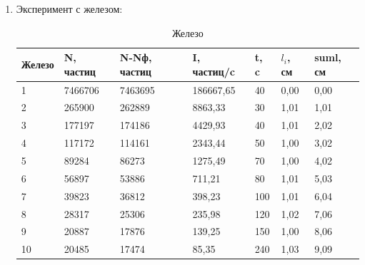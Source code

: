 \documentclass[a4paper]{article}
\begin{document}
\begin{enumerate}
    \item Эксперимент с железом:
        \begin{table}[H]
            \begin{center}
                \begin{tabular}{|l|l|l|l|l|l|l|}
                    \hline
                    Железо & N, частиц & N-Nф, частиц & I, частиц/c & t, c &  $l_i$, см & suml, см \\ \hline
                    1      & 7466706   & 7463695      & 186667,65   & 40   & 0,00     & 0,00     \\ \hline
                    2      & 265900    & 262889       & 8863,33     & 30   & 1,01     & 1,01     \\ \hline
                    3      & 177197    & 174186       & 4429,93     & 40   & 1,01     & 2,02     \\ \hline
                    4      & 117172    & 114161       & 2343,44     & 50   & 1,00     & 3,02     \\ \hline
                    5      & 89284     & 86273        & 1275,49     & 70   & 1,00     & 4,02     \\ \hline
                    6      & 56897     & 53886        & 711,21      & 80   & 1,01     & 5,03     \\ \hline
                    7      & 39823     & 36812        & 398,23      & 100  & 1,01     & 6,04     \\ \hline
                    8      & 28317     & 25306        & 235,98      & 120  & 1,02     & 7,06     \\ \hline
                    9      & 20887     & 17876        & 139,25      & 150  & 1,00     & 8,06     \\ \hline
                    10     & 20485     & 17474        & 85,35       & 240  & 1,03     & 9,09     \\ \hline
                \end{tabular}
            \caption{Железо}
            \end{center}
        \end{table}
            

\end{enumerate}
\end{document}
